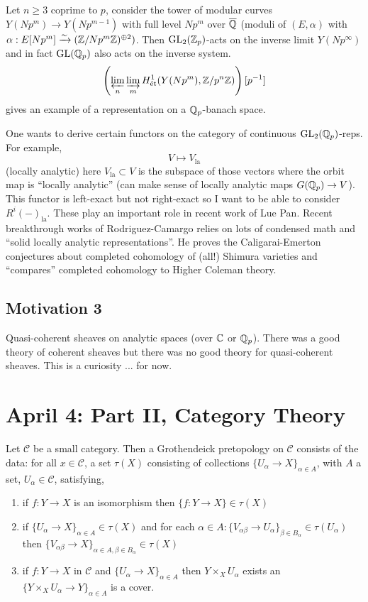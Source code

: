 \documentclass[12pt]{article}
\newcommand{\la}{\mathrm{la}}
\newcommand{\cC}{\mathcal{C}}
\begin{document}
\begin{example}
Let $n \ge 3$ coprime to $p$, consider the tower of modular curves $Y(N p^m) \to Y(N p^{m-1})$ with full level $N p^m$ over $\overline{\mathbb{Q}}$ (moduli of $(E, \alpha)$ with $\alpha : E[N p^m] \xrightarrow{\sim} (\mathbb{Z} / N p^m \mathbb{Z})^{\oplus 2})$. Then $\mathrm{GL}_2(\mathbb{Z}_p)$-acts on the inverse limit $Y(N p^\infty)$ and in fact $\mathrm{GL}(\mathbb{Q}_p)$ also acts on the inverse system. 
\[ \left( \operatorname*{\varprojlim}_n \operatorname*{\varinjlim}_m H^1_{\text{\'{e}t}}(Y(N p^m), \mathbb{Z} / p^n \mathbb{Z}) \right) [p^{-1}] \] 
gives an example of a representation on a $\mathbb{Q}_p$-banach space.
\end{example}

One wants to derive certain functors on the category of continuous $\mathrm{GL}_2(\mathbb{Q}_p)$-reps. For example,
\[ V \mapsto V_{\la} \]
(locally analytic) here $V_{\la} \subset V$ is the subspace of those vectors where the orbit map is ``locally analytic'' (can make sense of locally analytic maps $G(\mathbb{Q}_p) \to V$). This functor is left-exact but not right-exact so I want to be able to consider $R^i (-)_{\la}$. These play an important role in recent work of Lue Pan. Recent breakthrough works of Rodriguez-Camargo relies on lots of condensed math and ``solid locally analytic representations''. He proves the Caligarai-Emerton conjectures about completed cohomology of (all!) Shimura varieties and ``compares'' completed cohomology to Higher Coleman theory. 

\subsection{Motivation 3}

Quasi-coherent sheaves on analytic spaces (over $\mathbb{C}$ or $\mathbb{Q}_p$). There was a good theory of coherent sheaves but there was no good theory for quasi-coherent sheaves. This is a curiosity ... for now. 

\section{April 4: Part II, Category Theory}

\begin{defn}
Let $\cC$ be a small category. Then a Grothendeick pretopology on $\cC$ consists of the data: for all $x \in \cC$, a set $\tau(X)$ consisting of collections $\{ U_\alpha \to X \}_{\alpha \in A}$, with $A$ a set, $U_\alpha \in \cC$, satisfying,
\begin{enumerate}
\item if $f : Y \to X$ is an isomorphism then $\{ f : Y \to X \} \in \tau(X)$

\item if $\{ U_\alpha \to X \}_{\alpha \in A} \in \tau(X)$ and for each $\alpha \in A : \{ V_{\alpha \beta} \to U_\alpha \}_{\beta \in B_\alpha} \in \tau(U_\alpha)$ then $\{ V_{\alpha \beta} \to X \}_{\alpha \in A, \beta \in B_\alpha} \in \tau(X)$

\item if $f : Y \to X$ in $\cC$ and $\{ U_\alpha \to X \}_{\alpha \in A}$ then $Y \times_X U_\alpha$ exists an $\{ Y \times_X U_\alpha \to Y \}_{\alpha \in A}$ is a cover. 
\end{enumerate}
\end{defn}
\end{document}

